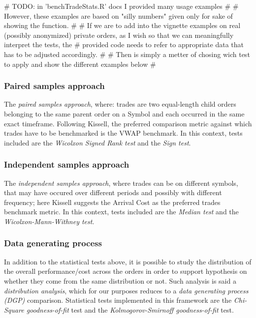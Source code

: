\begin{Schunk}
\begin{Sinput}
# TODO: in 'benchTradeStats.R' docs I provided many usage examples 
# 
# However, these examples are based on "silly numbers" given only for sake of showing the function.
# 
# If we are to add into the vignette examples on real (possibly anonymized) private orders, as I wish so that we can meaningfully interpret the tests, the 
# provided code needs to refer to appropriate data that has to be adjusted accordingly. 
# 
# Then is simply a metter of chosing wich test to apply and show the different examples below
# 
\end{Sinput}
\end{Schunk}

\hypertarget{paired-samples-approach}{%
\subsubsection{Paired samples approach}\label{paired-samples-approach}}

The \emph{paired samples approach}, where: trades are two equal-length
child orders belonging to the same parent order on a Symbol and each
occurred in the same exact timeframe. Following Kissell, the preferred
comparison metric against which trades have to be benchmarked is the
VWAP benchmark. In this context, tests included are the
\emph{Wicolxon Signed Rank test} and the \emph{Sign test}.

\hypertarget{independent-samples-approach}{%
\subsubsection{Independent samples
approach}\label{independent-samples-approach}}

The \emph{independent samples approach}, where trades can be on
different symbols, that may have occured over different periods and
possibly with different frequency; here Kissell suggests the Arrival
Cost as the preferred trades benchmark metric. In this context, tests
included are the \emph{Median test} and the
\emph{Wicolxon-Mann-Withney test}.

\hypertarget{data-generating-process}{%
\subsubsection{Data generating process}\label{data-generating-process}}

In addition to the statistical tests above, it is possible to study the
distribution of the overall performance/cost across the orders in order
to support hypothesis on whether they come from the same distribution or
not. Such analysis is said a \emph{distribution analysis}, which for our
purposes reduces to a \emph{data generating process (DGP)} comparison.
Statistical tests implemented in this framework are the
\emph{Chi-Square goodness-of-fit} test and the
\emph{Kolmogorov-Smirnoff goodness-of-fit} test.

